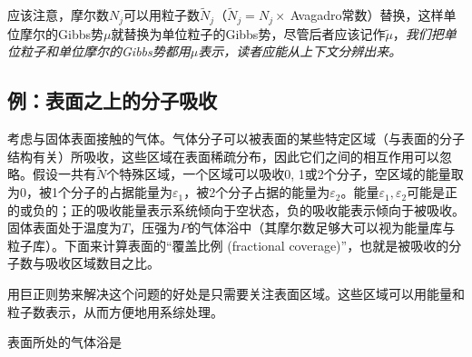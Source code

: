 应该注意，摩尔数$N_j$可以用粒子数$\tilde{N}_j$（$\tilde{N}_j = N_j \times \ $Avagadro常数）替换，这样单位摩尔的Gibbs势$\mu$就替换为单位粒子的Gibbs势，尽管后者应该记作$\tilde{\mu}$，\textit{我们把单位粒子和单位摩尔的Gibbs势都用$\mu$表示，读者应能从上下文分辨出来。}

\subsection*{例：表面之上的分子吸收}
考虑与固体表面接触的气体。气体分子可以被表面的某些特定区域（与表面的分子结构有关）所吸收，这些区域在表面稀疏分布，因此它们之间的相互作用可以忽略。假设一共有$\tilde{N}$个特殊区域，一个区域可以吸收0, 1或2个分子，空区域的能量取为0，被1个分子的占据能量为$\varepsilon_1$，被2个分子占据的能量为$\varepsilon_2$。能量$\varepsilon_1, \varepsilon_2$可能是正的或负的；正的吸收能量表示系统倾向于空状态，负的吸收能表示倾向于被吸收。固体表面处于温度为$T$，压强为$P$的气体浴中（其摩尔数足够大可以视为能量库与粒子库）。下面来计算表面的“覆盖比例 (fractional coverage)”，也就是被吸收的分子数与吸收区域数目之比。

用巨正则势来解决这个问题的好处是只需要关注表面区域。这些区域可以用能量和粒子数表示，从而方便地用系综处理。

表面所处的气体浴是